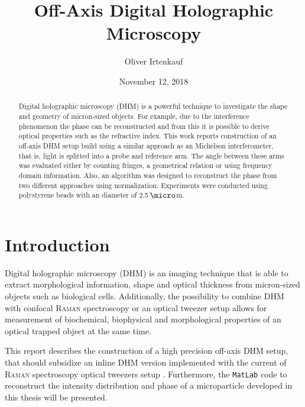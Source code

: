 \documentclass{article}
\title{Off-Axis Digital Holographic Microscopy}
\author{Oliver Irtenkauf\\\mail{oliver.irtenkauf@uni-konstanz.de}}
\date{November 12, 2018}
\begin{document}
\begin{titlepage}
    \maketitle
    \thispagestyle{fancy}
    \headheight 25pt
\begin{abstract}
     \noindent Digital holographic microscopy (DHM) is a powerful technique to investigate the shape and geometry of micron-sized objects. For example, due to the interference phenomenon the phase can be reconstructed and from this it is possible to derive optical properties such as the refractive index. This work reports construction of an off-axis DHM setup build using a similar approach as an Michelson interferometer, that is, light is splitted into a probe and reference arm. The angle between these arms was evaluated either by counting fringes, a geometrical relation or using frequency domain information. Also, an algorithm was designed to reconstruct the phase from two different approaches using normalization. Experiments were conducted using polystyrene beads with an diameter of 2.5\,$\micro$m.
\end{abstract}
\end{titlepage}
\newpage
\pagestyle{fancy}
\headheight 25pt 
\rhead{\small \myTitle\\ \today}
\cfoot{\thepage}
\footskip 45pt

\tableofcontents
\newpage
{}
\setcounter{page}{1}
\section{Introduction}
Digital holographic microscopy (DHM) is an imaging technique that is able to extract morphological information, shape and optical thickness from micron-sized objects such as biological cells. Additionally, the possibility to combine DHM with confocal \textsc{Raman} spectroscopy or an optical tweezer setup allows for measurement of biochemical, biophysical and morphological properties of an optical trapped object at the same time.

This report describes the construction of a high precision off-axis DHM setup, that should subsidize an inline DHM version implemented with the current of \textsc{Raman} spectroscopy optical tweezers setup \cite{PMID:16844748}.
Furthermore, the \texttt{MatLab} \cite{matlab} code to reconstruct the intensity distribution and phase of a microparticle developed in this thesis will be presented.
\end{document}
